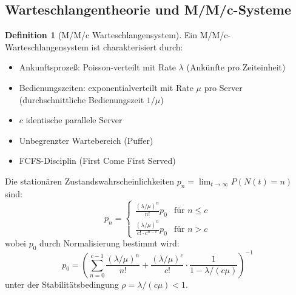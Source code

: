 \documentclass[a4paper,11pt]{article}
\theoremstyle{definition}
\newtheorem{definition}{Definition}
\begin{document}
\subsection{Warteschlangentheorie und M/M/c-Systeme}

\begin{definition}[M/M/c Warteschlangensystem]
    \label{def:mmn}
    Ein M/M/c-Warteschlangensystem ist charakterisiert durch:
    \begin{itemize}
        \item Ankunftsprozeß: Poisson-verteilt mit Rate $\lambda$ (Ankünfte pro Zeiteinheit)
        \item Bedienungszeiten: exponentialverteilt mit Rate $\mu$ pro Server 
              (durchschnittliche Bedienungszeit $1/\mu$)
        \item $c$ identische parallele Server
        \item Unbegrenzter Wartebereich (Puffer)
        \item FCFS-Disciplin (First Come First Served)
    \end{itemize}

    Die stationären Zustandswahrscheinlichkeiten $p_n = \lim_{t \to \infty} P(N(t) = n)$ sind:
    \[
        p_n = \begin{cases}
            \frac{(\lambda/\mu)^n}{n!} p_0 & \text{für } n \leq c \\
            \frac{(\lambda/\mu)^n}{c! \cdot c^{n-c}} p_0 & \text{für } n > c
        \end{cases}
    \]
    wobei $p_0$ durch Normalisierung bestimmt wird:
    \[
        p_0 = \left( \sum_{n=0}^{c-1} \frac{(\lambda/\mu)^n}{n!} + \frac{(\lambda/\mu)^c}{c!} \cdot 
               \frac{1}{1 - \lambda/(c\mu)} \right)^{-1}
    \]
    unter der Stabilitätsbedingung $\rho = \lambda/(c\mu) < 1$.
\end{definition}
\end{document}
